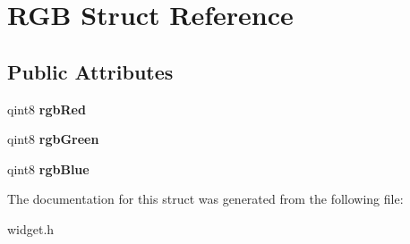 \section{R\+G\+B Struct Reference}
\label{struct_r_g_b}
\subsection*{Public Attributes}
\begin{DoxyCompactItemize}
\item 
qint8 {\bfseries rgb\+Red}\label{struct_r_g_b_a693caaf012a4d7abe86cb4e7fd0c8d1a}

\item 
qint8 {\bfseries rgb\+Green}\label{struct_r_g_b_ada9e931ab349e34398449e2ac1c9162b}

\item 
qint8 {\bfseries rgb\+Blue}\label{struct_r_g_b_a382f19b3318018ffd99836273ae9ad88}

\end{DoxyCompactItemize}


The documentation for this struct was generated from the following file\+:\begin{DoxyCompactItemize}
\item 
widget.\+h\end{DoxyCompactItemize}
